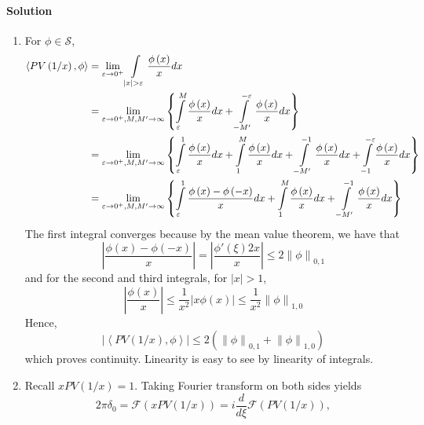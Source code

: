 \documentclass[letterpaper,twoside,11pt]{article}
\theoremstyle{mystyle}
\newcommand{\sch}{\mathcal S}
\begin{document}
\paragraph*{Solution}
\begin{enumerate}
  \item For $\phi \in \sch$, 
  \begin{align*}
    \left\langle {PV\left( {1/x} \right),\phi } \right\rangle  &= \mathop {\lim }\limits_{\varepsilon  \to {0^ + }} \int\limits_{\left| x \right| > \varepsilon } {\frac{{\phi \left( x \right)}}{x}dx}  \hfill \\
     &= \mathop {\lim }\limits_{\varepsilon  \to {0^ + },M,M' \to \infty } \left\{ {\int\limits_\varepsilon ^M {\frac{{\phi \left( x \right)}}{x}dx}  + \int\limits_{ - M'}^{ - \varepsilon } {\frac{{\phi \left( x \right)}}{x}dx} } \right\} \hfill \\
     &= \mathop {\lim }\limits_{\varepsilon  \to {0^ + },M,M' \to \infty } \left\{ {\int\limits_\varepsilon ^1 {\frac{{\phi \left( x \right)}}{x}dx}  + \int\limits_1^M {\frac{{\phi \left( x \right)}}{x}dx}  + \int\limits_{ - M'}^{ - 1} {\frac{{\phi \left( x \right)}}{x}dx}  + \int\limits_{ - 1}^{ - \varepsilon } {\frac{{\phi \left( x \right)}}{x}dx} } \right\} \hfill \\
     &= \mathop {\lim }\limits_{\varepsilon  \to {0^ + },M,M' \to \infty } \left\{ {\int\limits_\varepsilon ^1 {\frac{{\phi \left( x \right) - \phi \left( { - x} \right)}}{x}dx + \int\limits_1^M {\frac{{\phi \left( x \right)}}{x}dx}  + \int\limits_{ - M'}^{ - 1} {\frac{{\phi \left( x \right)}}{x}dx} } } \right\} 
  \end{align*}
  The first integral converges because by the mean value theorem, we have that 
  \[\left| {\frac{{\phi \left( x \right) - \phi \left( { - x} \right)}}{x}} \right| = \left| {\frac{{\phi '\left( \xi  \right)2x}}{x}} \right| \leqslant 2{\left\| \phi  \right\|_{0,1}}\]
  and for the second and third integrals, for $|x|>1$, 
  \[\left| {\frac{{\phi \left( x \right)}}{x}} \right| \leqslant \frac{1}{{{x^2}}}\left| {x\phi \left( x \right)} \right| \leqslant \frac{1}{{{x^2}}}{\left\| \phi  \right\|_{1,0}}\]
  Hence, 
  \[\left| {\left\langle {PV\left( {1/x} \right),\phi } \right\rangle } \right| \leqslant 2\left( {{{\left\| \phi  \right\|}_{0,1}} + {{\left\| \phi  \right\|}_{1,0}}} \right)\]
  which proves continuity. Linearity is easy to see by linearity of integrals. 
  \item Recall $xPV\left( 1/x \right)=1$. Taking Fourier transform on both sides yields 
  \[2\pi {\delta _0} = \mathcal{F}\left( {xPV\left( {1/x} \right)} \right) = i\frac{d}{{d\xi }}\mathcal{F}\left( {PV\left( {1/x} \right)} \right),\]

\end{enumerate}
\end{document}
